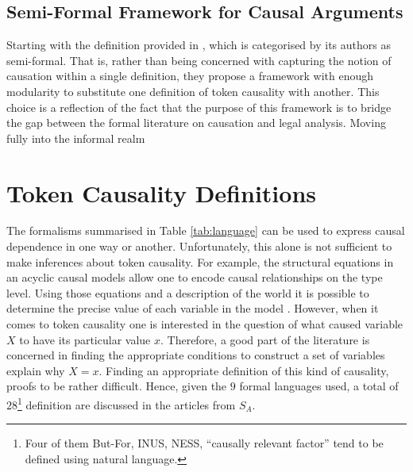 \documentclass[11pt,a4paper]{book}
\theoremstyle{definition}
\theoremstyle{definition}
\theoremstyle{definition}
\theoremstyle{remark}
\newcommand{\prset}{S_{A}}
\begin{document}
\subsection{Semi-Formal Framework for Causal Arguments}

 Starting with the definition provided in \parencite{liepicna2020arguing}, which is categorised by its authors as semi-formal. That is, rather than being concerned with capturing the notion of causation within a single definition, they propose a framework with enough modularity to substitute one definition of token causality with another. This choice is a reflection of the fact that the purpose of this framework is to bridge the gap between the formal literature on causation and legal analysis. Moving fully into the informal realm
 
 

\section{Token Causality Definitions}

The formalisms summarised in Table \ref{tab:language} can be used to express causal dependence in one way or another. Unfortunately, this alone is not sufficient to make inferences about token causality.
For example, the structural equations in an acyclic causal models allow one to encode causal relationships on the type level. Using those equations and a description of the world it is possible to determine the precise value 
of each variable in the model \parencite{halpern2015cause}. However, when it comes to token causality one is interested in the question of what caused variable $X$ to have its particular value $x$. Therefore, a good part of the literature is concerned in finding the appropriate conditions to construct a set of variables explain why $X=x$. Finding an appropriate definition of this kind of causality, proofs to be rather difficult. Hence, given the $9$ formal languages used, a total of $28$\footnote{Four of them But-For, INUS, NESS, ``causally relevant factor'' tend to be defined using natural language.} definition are discussed in the articles from $\prset$.
\end{document}
